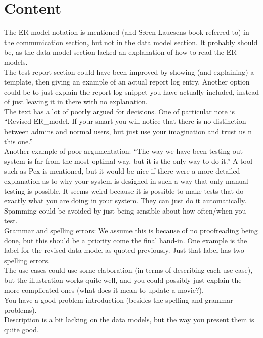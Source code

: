 \section{Content}
The ER-model notation is mentioned (and Søren Lauesens book referred to) in the communication section, but not in the data model section. It probably should be, as the data model section lacked an explanation of how to read the ER-models.\\
The test report section could have been improved by showing (and explaining) a template, then giving an example of an actual report log entry. Another option could be to just explain the report log snippet you have actually included, instead of just leaving it in there with no explanation.\\
The text has a lot of poorly argued for decisions. One of particular note is “Revised ER\_model. If your smart you will notice that there is no distinction between admins and normal users, but just use your imagination and trust us n this one.” \\
Another example of poor argumentation: “The way we have been testing out system is far from the most optimal way, but it is the only way to do it.” A tool such as Pex is mentioned, but it would be nice if there were a more detailed explanation as to why your system is designed in such a way that only manual testing is possible. It seems weird because it is possible to make tests that do exactly what you are doing in your system. They can just do it automatically. Spamming could be avoided by just being sensible about how often/when you test.\\
Grammar and spelling errors: We assume this is because of no proofreading being done, but this should be a priority come the final hand-in. One example is the label for the revised data model as quoted previously. Just that label has two spelling errors.\\
The use cases could use some elaboration (in terms of describing each use case), but the illustration works quite well, and you could possibly just explain the more complicated ones (what does it mean to update a movie?).\\ 
You have a good problem introduction (besides the spelling and grammar problems). \\
Description is a bit lacking on the data models, but the way you present them is quite good.\\